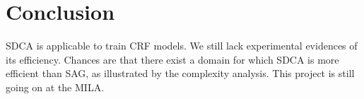 \documentclass{article}
\DeclareMathOperator{\1}{\mathbb{1}}
\begin{document}
\section*{Conclusion}

SDCA is applicable to train CRF models. 
We still lack experimental evidences of its efficiency.
Chances are that there exist a domain for which SDCA is more efficient than SAG, as illustrated by the complexity analysis.
This project is still going on at the MILA.

\printbibliography
\end{document}

